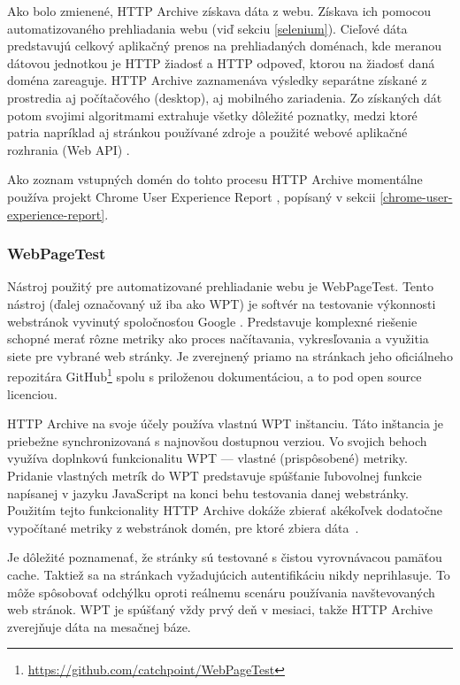 Ako bolo zmienené, HTTP Archive získava dáta z webu. 
Získava ich pomocou automatizovaného prehliadania webu (viď sekciu \ref{selenium}).
Cieľové dáta predstavujú celkový aplikačný prenos na prehliadaných doménach, kde meranou dátovou jednotkou je HTTP žiadosť a HTTP odpoveď, ktorou na žiadosť daná doména zareaguje.
HTTP Archive zaznamenáva výsledky separátne získané z prostredia aj počítačového (desktop), aj mobilného zariadenia.
Zo získaných dát potom svojimi algoritmami extrahuje všetky dôležité poznatky, medzi ktoré patria napríklad aj stránkou používané zdroje a použité webové aplikačné rozhrania (Web API) \cite{httparchive-homepage}.

Ako zoznam vstupných domén do tohto procesu HTTP Archive momentálne používa projekt Chrome User Experience Report \cite{httparchive-faq}, popísaný v sekcii \ref{chrome-user-experience-report}.

\subsubsection{WebPageTest}

Nástroj použitý pre automatizované prehliadanie webu je WebPageTest. Tento nástroj (ďalej označovaný už iba ako WPT) je softvér na testovanie výkonnosti webstránok vyvinutý spoločnosťou Google \cite{webpagetest}. 
Predstavuje komplexné riešenie schopné merať rôzne metriky ako proces načítavania, vykresľovania a využitia siete pre vybrané web stránky. 
Je zverejnený priamo na stránkach jeho oficiálneho repozitára GitHub\footnote{\href{https://github.com/catchpoint/WebPageTest}{https://github.com/catchpoint/WebPageTest}} spolu s priloženou dokumentáciou, a to pod open source licenciou.

HTTP Archive na svoje účely používa vlastnú WPT inštanciu. 
Táto inštancia je priebežne synchronizovaná s najnovšou dostupnou verziou.
Vo svojich behoch využíva doplnkovú funkcionalitu WPT --- vlastné (prispôsobené) metriky.
Pridanie vlastných metrík do WPT predstavuje spúšťanie ľubovolnej funkcie napísanej v jazyku JavaScript na konci behu testovania danej webstránky. 
Použitím tejto funkcionality HTTP Archive dokáže zbierať akékoľvek dodatočne vypočítané metriky z webstránok domén, pre ktoré zbiera \mbox{dáta \cite{webpagetest}}.

Je dôležité poznamenať, že stránky sú testované s čistou vyrovnávacou pamäťou cache. 
Taktiež sa na stránkach vyžadujúcich autentifikáciu nikdy neprihlasuje.
To môže spôsobovať odchýlku oproti reálnemu scenáru používania navštevovaných web stránok. 
WPT je spúšťaný vždy prvý deň v mesiaci, takže HTTP Archive zverejňuje dáta na mesačnej báze.

